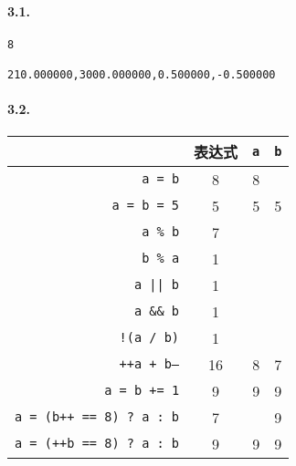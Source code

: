\documentclass[UTF8]{ctexart}
\begin{document}
\pagestyle{main}

\paragraph{3.1.}
\begin{lstlisting}[showspaces=true, showlines=true]
8

210.000000,3000.000000,0.500000,-0.500000

\end{lstlisting}

\paragraph{3.2.}
\begin{center}
    \begin{tabular}{rccc}
        \toprule
                                        & 表达式 & \texttt{a} & \texttt{b} \\
        \midrule
        \texttt{a = b}                  & 8      & 8          &            \\
        \texttt{a = b = 5}              & 5      & 5          & 5          \\
        \texttt{a \% b}                 & 7      &            &            \\
        \texttt{b \% a}                 & 1      &            &            \\
        \texttt{a || b}                 & 1      &            &            \\
        \texttt{a \&\& b}               & 1      &            &            \\
        \texttt{!(a / b)}               & 1      &            &            \\
        \texttt{++a + b--}              & 16     & 8          & 7          \\
        \texttt{a = b += 1}             & 9      & 9          & 9          \\
        \texttt{a = (b++ == 8) ? a : b} & 7      &            & 9          \\
        \texttt{a = (++b == 8) ? a : b} & 9      & 9          & 9          \\
        \bottomrule
    \end{tabular}
\end{center}
\end{document}
